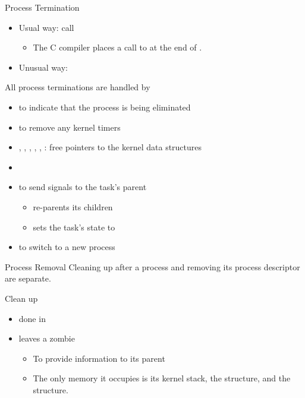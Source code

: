 \begin{frame}{Process Termination}
  \begin{itemize}
  \item Usual way: call 
    \begin{itemize}
    \item The C compiler places a call to  at the end of .
    \end{itemize}
  \item Unusual way: 
  \end{itemize}
\end{frame}

\begin{frame}
  \begin{block}{All process terminations are handled by }
    \begin{itemize}
    \item {} to indicate that the process is being eliminated
    \item {} to remove any kernel timers
    \item {}, , ,
      , , : free
      pointers to the kernel data structures
    \item {}
    \item {} to send signals to the task's parent
      \begin{itemize}
      \item re-parents its children
      \item sets the task's state to 
      \end{itemize}
    \item {} to switch to a new process
    \end{itemize}
  \end{block}
\end{frame}

\begin{frame}{Process Removal}
  Cleaning up after a process and removing its process descriptor are separate.
  \begin{block}{Clean up}
    \begin{itemize}
    \item done in 
    \item leaves a zombie
      \begin{itemize}
      \item To provide information to its parent
      \item The only memory it occupies is its kernel stack, the 
        structure, and the  structure.
      \end{itemize}
    \end{itemize}
  \end{block}
\end{frame}

